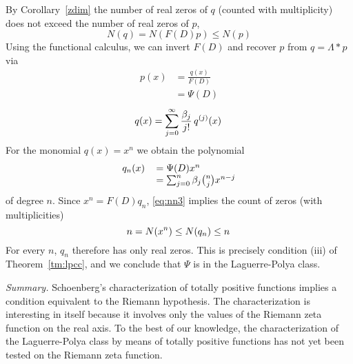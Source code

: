 \documentclass{article}
\newcommand{\tmem}[1]{{\em #1\/}}
\providecommand{\*}{{\opl}}
\newcommand{\<}{}
\newcommand{\>}{}
\newcommand{\tp}{totally positive}
\newcommand{\lpc}{Laguerre-Polya class}
\begin{document}
By Corollary~\ref{zdim} the number of real zeros of $q$ (counted with
multiplicity) does not exceed the number of real zeros of $p$,
\begin{equation}
  \label{eq:nn3} N (q) = N (F (D) p) \leq N (p)
\end{equation}
Using the functional calculus, we can invert $F (D)$ and recover $p$ from $q =
\Lambda \ast p$ via
\begin{equation}
  \begin{array}{ll}
    p (x) & = \frac{q (x)}{F (D)} \\
    & = \Psi (D)
  \end{array}
\end{equation}
\begin{equation}
  q (x) = \sum_{j = 0}^{\infty} \frac{\beta_j}{j!}  \hspace{0.17em} q^{(j)}
  (x) \hspace{0.17em}
\end{equation}
For the monomial $q (x) = x^n$ we obtain the polynomial
\begin{equation}
  \begin{array}{ll}
    q_n (x) \hspace{0.17em} & = \Psi (D) x^n\\
    & = \sum_{j = 0}^n \beta_j \binom{n}{j} x^{n - j}
  \end{array}
\end{equation}
of degree $n$. Since $x^n = F (D) q_n$, \eqref{eq:nn3} implies the count of
zeros (with multiplicities)
\begin{equation}
  n = N (x^n) \leq N (q_n) \leq n \hspace{0.17em}
\end{equation}
For every $n$, $q_n$ therefore has only real zeros. This is precisely
condition (iii) of Theorem~\ref{tm:lpcc}, and we conclude that $\Psi$ is in
the {\lpc}.

{\tmem{Summary.}} Schoenberg's characterization of {\tp} functions implies a
condition equivalent to the Riemann hypothesis. The characterization is
interesting in itself because it involves only the values of the Riemann zeta
function on the real axis. To the best of our knowledge, the characterization
of the {\lpc} by means of {\tp} functions has not yet been tested on the
Riemann zeta function.
\end{document}

